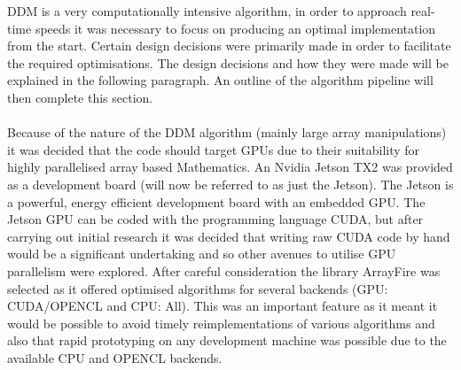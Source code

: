 \documentclass[11pt]{article}
\begin{document}
DDM is a very computationally intensive algorithm, in order to approach real-time speeds it was necessary to focus on producing an optimal implementation from the start. Certain design decisions were primarily made in order to facilitate the required optimisations. The design decisions and how they were made will be explained in the following paragraph. An outline of the algorithm pipeline will then complete this section.
\\\\
Because of the nature of the DDM algorithm (mainly large array manipulations) it was decided that the code should target GPUs due to their suitability for highly parallelised array based Mathematics. An Nvidia Jetson TX2 was provided as a development board (will now be referred to as just the Jetson). The Jetson is a powerful, energy efficient development board with an embedded GPU\cite{jetson}. The Jetson GPU can be coded with the programming language CUDA, but after carrying out initial research \cite{cuda_book} it was decided that writing raw CUDA code by hand would be a significant undertaking and so other avenues to utilise GPU parallelism were explored. After careful consideration the library ArrayFire was selected as it offered optimised algorithms for several backends (GPU: CUDA/OPENCL and CPU: All)\cite{arrayfire}. This was an important feature as it meant it would be possible to avoid timely reimplementations of various algorithms and also that rapid prototyping on any development machine was possible due to the available CPU and OPENCL backends.
\\\\
\end{document}
